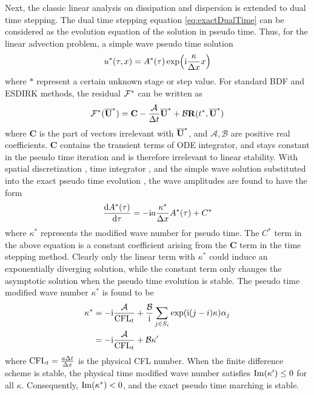 Next, the classic linear analysis on dissipation and dispersion is
extended to dual time stepping. The dual time
stepping equation \eqref{eq:exactDualTime} can be
considered as the evolution equation of the solution in pseudo time.
Thus, for the linear advection problem,
a simple wave pseudo time solution
\begin{equation}
    u^*(\tau,x) = A^*(\tau)\exp(\mathrm{i} \frac{\kappa}{{\Delta} x} x)
    \label{eq:simpleWaveTestTau}
\end{equation}
where $*$ represent a certain unknown stage or step value.
For standard BDF and ESDIRK methods, the residual $\mathcal{F}^*$
can be written as
\begin{equation}
    \mathcal{F}^*(\overline{\mathbf{U}}^*) = \mathbf{C} - \frac{\mathcal{A}}{{\Delta} t} \overline{\mathbf{U}}^* + \mathcal{B}\mathbf{R}(t^*, \overline{\mathbf{U}}^*)
    \label{eq:canonicalFF}
\end{equation}
where $\mathbf{C}$ is the part of vectors irrelevant with $\overline{\mathbf{U}}^*$,
and $\mathcal{A},\mathcal{B}$ are positive real coefficients.
$\mathbf{C}$ contains the transient terms of ODE integrator,
and stays constant in the pseudo time iteration and is
therefore irrelevant to linear stability.
With  spatial discretization ,
time integrator ,
and
the simple wave solution 
substituted into the exact pseudo time evolution ,
the wave amplitudes are found to have the form
\begin{equation}
    \frac{\dd A^*(\tau)}{\dd \tau} = -\mathrm{i} a\frac{\kappa^*}{{\Delta} x}  A^*(\tau) + C^*
    \label{eq:kappaSDefTau}
\end{equation}
where $\kappa^*$ represents the modified wave number for pseudo time.
The $C^*$ term in the above equation is a constant coefficient arising
from the $\mathbf{C}$ term in the time stepping method.
Clearly only the linear term with $\kappa^*$ could induce an exponentially diverging
solution, while the constant term only changes the asymptotic solution
when the pseudo time evolution is stable.
The pseudo time modified wave number $\kappa^*$ is found to be
\begin{equation}
    \begin{aligned}
        \kappa^* & = -\mathrm{i}\frac{\mathcal{A}}{\text{CFL}_t} +
        \frac{\mathcal{B}}{\mathrm{i}} \sum_{j\in S_i}\exp(\mathrm{i} (j-i)\kappa)\alpha_j \\
                 & =-\mathrm{i}\frac{\mathcal{A}}{\text{CFL}_t} + \mathcal{B}\kappa'
    \end{aligned}
\end{equation}
where $\text{CFL}_t = \frac{a{\Delta} t }{{\Delta} x}$ is the physical CFL number.
When the finite difference scheme is stable,
the physical time modified wave number satisfies $\mathrm{Im} (\kappa') \leq 0$ for
all $\kappa$.
Consequently, $\mathrm{Im} (\kappa^*) < 0$, and the exact pseudo time marching
is stable.

